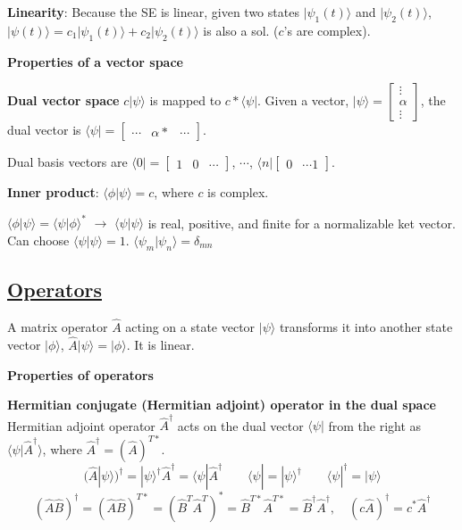     \textbf{Linearity}: Because the SE is linear, given two states $|\psi_1(t) \rangle$ and $|\psi_2(t) \rangle$, $|\psi(t) \rangle = c_1 |\psi_1(t) \rangle + c_2|\psi_2(t)\rangle$ is also a sol. ($c$'s are complex).

\textbf{Properties of a vector space}

\textbf{Dual vector space}
$c|\psi \rangle$ is mapped to $c* \langle \psi |$. Given a vector, $|\psi \rangle = \begin{bmatrix} \vdots \\ \alpha \\ \vdots \end{bmatrix}$, the dual vector is $\langle \psi | = \begin{bmatrix} \cdots & \alpha* & \cdots \end{bmatrix}$.

Dual basis vectors are $\langle 0 | = \begin{bmatrix} 1 & 0 & \cdots \end{bmatrix}$, $\cdots$, $\langle n| \begin{bmatrix} 0 & \cdots 1 \end{bmatrix}$.

\textbf{Inner product}: $\langle \phi | \psi \rangle = c$, where $c$ is complex.

$\langle \phi | \psi \rangle = \langle \psi | \phi \rangle^*$ $\rightarrow$ $\langle \psi | \psi \rangle$ is real, positive, and finite for a normalizable ket vector. Can choose $\langle \psi | \psi \rangle = 1$. $\langle \psi_m | \psi_n \rangle = \delta_{mn}$

\subsection{\underline{Operators}}
A matrix operator $\widehat{A}$ acting on a state vector $|\psi \rangle$ transforms it into another state vector $|\phi \rangle$, $\widehat{A} |\psi \rangle = | \phi \rangle$. It is linear.

\textbf{Properties of operators}

\textbf{Hermitian conjugate (Hermitian adjoint) operator in the dual space} \\
Hermitian adjoint operator $\widehat{A}^{\dag}$ acts on the dual vector $\langle \psi |$ from the right as $\langle \psi | \widehat{A} ^{\dag} \rangle$, where $\widehat{A}^{\dag} = (\widehat{A})^{T*}$.
$$(\widehat{A} | \psi \rangle)^{\dag} = |\psi \rangle^{\dag} \widehat{A}^{\dag} = \langle \psi | \widehat{A}^{\dag} \qquad \langle \psi | = | \psi \rangle^{\dag} \qquad \langle \psi | ^{\dag} = | \psi \rangle$$
$$(\widehat{A}\widehat{B})^{\dag} = (\widehat{A} \widehat{B})^{T*} = (\widehat{B}^T \widehat{A}^T)^* = \widehat{B}^{T*} \widehat{A}^{T*} = \widehat{B}^{\dag} \widehat{A}^{\dag}, \quad (c\widehat{A})^{\dag} = c^* \widehat{A}^{\dag}$$

